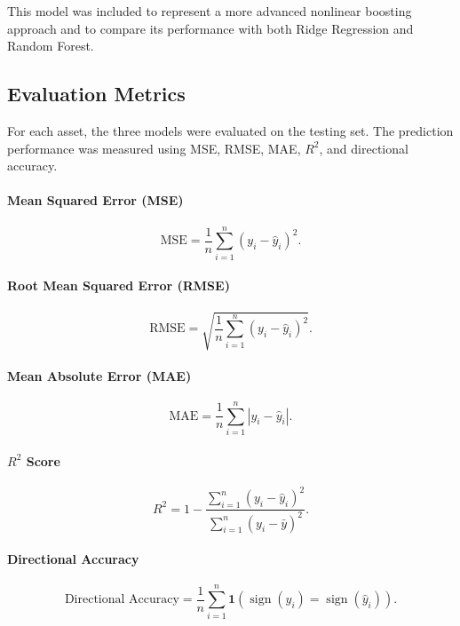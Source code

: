\documentclass[12pt]{article}
\begin{document}
This model was included to represent a more advanced nonlinear boosting approach and to compare its performance with both Ridge Regression and Random Forest.

\subsection{Evaluation Metrics}

For each asset, the three models were evaluated on the testing set. The prediction performance was measured using MSE, RMSE, MAE, $R^2$, and directional accuracy.

\paragraph{Mean Squared Error (MSE)}
\begin{equation}
\text{MSE}
=
\frac{1}{n}
\sum_{i=1}^{n}
(y_i - \hat{y}_i)^2.
\end{equation}

\paragraph{Root Mean Squared Error (RMSE)}
\begin{equation}
\text{RMSE}
=
\sqrt{
\frac{1}{n}
\sum_{i=1}^{n}
(y_i - \hat{y}_i)^2
}.
\end{equation}

\paragraph{Mean Absolute Error (MAE)}
\begin{equation}
\text{MAE}
=
\frac{1}{n}
\sum_{i=1}^{n}
|y_i - \hat{y}_i|.
\end{equation}

\paragraph{$R^2$ Score}
\begin{equation}
R^2
=
1
-
\frac{
\sum_{i=1}^{n}(y_i - \hat{y}_i)^2
}{
\sum_{i=1}^{n}(y_i - \bar{y})^2
}.
\end{equation}

\paragraph{Directional Accuracy}
\begin{equation}
\text{Directional Accuracy}
=
\frac{1}{n}
\sum_{i=1}^{n}
\mathbf{1}
\left(
\operatorname{sign}(y_i)
=
\operatorname{sign}(\hat{y}_i)
\right).
\end{equation}
\end{document}
